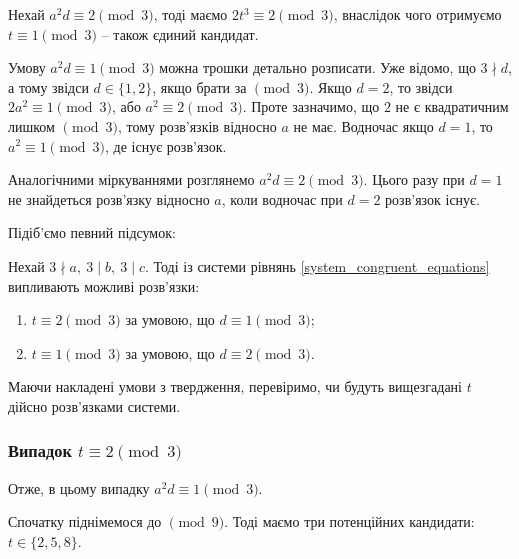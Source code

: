 \documentclass{thesis}
\begin{document}
Нехай $a^2 d \equiv 2 \pmod 3$, тоді маємо $2t^3 \equiv 2 \pmod 3$, внаслідок чого отримуємо $t \equiv 1 \pmod 3$ -- також єдиний кандидат.

Умову $a^2 d \equiv 1 \pmod 3$ можна трошки детально розписати. Уже відомо, що $3 \nmid d$, а тому звідси $d \in \{1,2\}$, якщо брати за $\pmod 3$. Якщо $d = 2$, то звідси $2a^2 \equiv 1 \pmod 3$, або $a^2 \equiv 2 \pmod 3$. Проте зазначимо, що $2$ не є квадратичним лишком $\pmod 3$, тому розв'язків відносно $a$ не має. Водночас якщо $d = 1$, то $a^2 \equiv 1 \pmod 3$, де існує розв'язок.

Аналогічними міркуваннями розглянемо $a^2 d \equiv 2 \pmod 3$. Цього разу при $d = 1$ не знайдеться розв'язку відносно $a$, коли водночас при $d = 2$ розв'язок існує.

Підіб'ємо певний підсумок: 

\begin{proposition}
Нехай $3 \nmid a,\ 3 \mid b,\  3 \mid c$. Тоді із системи рівнянь \eqref{system_congruent_equations} випливають можливі розв'язки: 
\begin{enumerate}
\item $t \equiv 2 \pmod 3$ за умовою, що $d \equiv 1 \pmod 3$;
\item $t \equiv 1 \pmod 3$ за умовою, що $d \equiv 2 \pmod 3$.
\end{enumerate}
\end{proposition}

Маючи накладені умови з твердження, перевіримо, чи будуть вищезгадані $t$ дійсно розв'язками системи.

\subsubsection{Випадок $t \equiv 2 \pmod 3$}
Отже, в цьому випадку $a^2d \equiv 1 \pmod 3$.

Спочатку піднімемося до $\pmod 9$. Тоді маємо три потенційних кандидати: $t \in \{2,5,8\}$.
\end{document}
